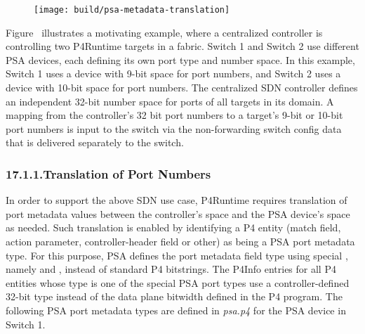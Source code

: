 \documentclass[11pt]{article}
\begin{document}
{%
\begin{figure}[tbp]%
\begin{mdcenter}%

\noindent{}\texttt{[image: build/psa-metadata-translation]}{}%

\mdhr{}%

\noindent{}%
\end{mdcenter}\label{fig-psa-metadata-translation}%
\end{figure}%

\noindent{}Figure~ illustrates a motivating example,
where a centralized controller is controlling two P4Runtime targets in a fabric.
Switch 1 and Switch 2 use different PSA devices, each defining its own port type
and number space. In this example, Switch 1 uses a device with 9-bit space for
port numbers, and Switch 2 uses a device with 10-bit space for port numbers. The
centralized SDN controller defines an independent 32-bit number space for ports
of all targets in its domain. A mapping from the controller's 32 bit port
numbers to a target's 9-bit or 10-bit port numbers is input to the switch via
the non-forwarding switch config data that is delivered separately to the
switch.%

\subsubsection{17.1.1.\hspace*{0.5em}Translation of Port Numbers}\label{sec-translation-of-port-numbers}%

\noindent{}In order to support the above SDN use case, P4Runtime requires translation of
port metadata values between the controller's space and the PSA device's space
as needed. Such translation is enabled by identifying a P4 entity (match field,
action parameter, controller-header field or other) as being a PSA port metadata
type. For this purpose, PSA defines the port metadata field type using special
, namely  and
, instead of standard P4 bitstrings. The P4Info entries for
all P4 entities whose type is one of the special PSA port types use a
controller-defined 32-bit type instead of the data plane bitwidth defined in the
P4 program. The following PSA port metadata types are defined in \emph{psa.p4} for
the PSA device in Switch 1.%

}
\end{document}
